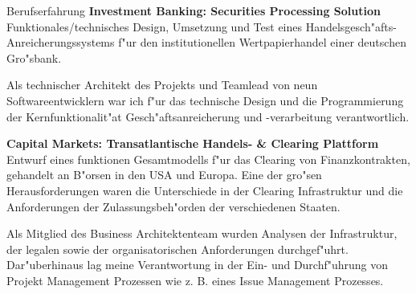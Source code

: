 \begin{rubric}{Berufserfahrung}
\entry*[10/2003 - 12/2004] \textbf{Investment Banking: Securities Processing Solution}\newline
{} 
Funktionales/technisches Design, Umsetzung und Test eines Handelsgesch"afts-Anreicherungssystems f"ur den institutionellen Wertpapierhandel einer deutschen Gro"sbank.\axelvspace

Als technischer Architekt des Projekts und Teamlead von neun Softwareentwicklern war ich f"ur das technische Design und die Programmierung der Kernfunktionalit"at Gesch"aftsanreicherung und -verarbeitung verantwortlich. 

\entry*[07/2003 - 10/2003] \textbf{Capital Markets: Transatlantische Handels- \& Clearing Plattform}\newline
{} 
Entwurf eines funktionen Gesamtmodells f"ur das Clearing von Finanzkontrakten, gehandelt an B"orsen in den USA und Europa. Eine der gro"sen Herausforderungen waren die Unterschiede in der Clearing Infrastruktur und die Anforderungen der Zulassungsbeh"orden der verschiedenen Staaten.\axelvspace

Als Mitglied des Business Architektenteam wurden Analysen der Infrastruktur, der legalen sowie der organisatorischen Anforderungen durchgef"uhrt. Dar"uberhinaus lag meine Verantwortung in der Ein- und Durchf"uhrung von Projekt Management Prozessen wie z. B. eines Issue Management Prozesses.




\end{rubric}
